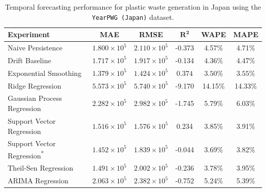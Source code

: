 \begin{table}[!ht]
	\centering
	\caption{\centering Temporal forecasting performance for plastic waste generation in Japan using the \texttt{YearPWG (Japan)} dataset.}
	\begin{tabular}{@{}lccccc@{}}
		\toprule
		\textbf{Experiment}                          & \textbf{MAE}          & \textbf{RMSE}         & $\mathbf{R^2}$     & \textbf{WAPE}       & \textbf{MAPE}       \\
		\midrule
		Naive Persistence                            & \(1.800 \times 10^5\) & \(2.110 \times 10^5\) & -0.373             & 4.57\%              & 4.71\%              \\
		Drift Baseline                               & \(1.717 \times 10^5\) & \(1.917 \times 10^5\) & -0.134             & 4.36\%              & 4.47\%              \\
		Exponential Smoothing                        & \(1.379 \times 10^5\) & \(1.424 \times 10^5\) & \(\mathbf{0.374}\) & \(\mathbf{3.50}\)\% & \(\mathbf{3.55}\)\% \\
		Ridge Regression                             & \(5.573 \times 10^5\) & \(5.740 \times 10^5\) & -9.170             & 14.15\%             & 14.33\%             \\
		Gaussian Process Regression                  & \(2.282 \times 10^5\) & \(2.982 \times 10^5\) & -1.745             & 5.79\%              & 6.03\%              \\
		Support Vector Regression                    & \(1.516 \times 10^5\) & \(1.576 \times 10^5\) & 0.234              & 3.85\%              & 3.91\%              \\
		Support Vector Regression\textsuperscript{*} & \(1.452 \times 10^5\) & \(1.839 \times 10^5\) & -0.044             & 3.69\%              & 3.82\%              \\
		Theil-Sen Regression                         & \(1.491 \times 10^5\) & \(2.002 \times 10^5\) & -0.236             & 3.78\%              & 3.95\%              \\
		ARIMA Regression                             & \(2.063 \times 10^5\) & \(2.382 \times 10^5\) & -0.752             & 5.24\%              & 5.39\%              \\
		\hline
	\end{tabular}
	\label{tab:japan_pwg_forecasting_metrics}
\end{table}
